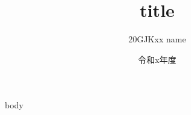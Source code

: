 \documentclass[uplatex,a4paper,12pt]{jsarticle}
\makeatletter
\def\supervisor#1{\gdef\@supervisor{#1}}
\makeatother
\begin{document}
\date{令和x年度}
\title{title}
\author{20GJKxx name}
\supervisor{下川 俊彦 教授}
\maketitle
\thispagestyle{empty}

body
\end{document}
